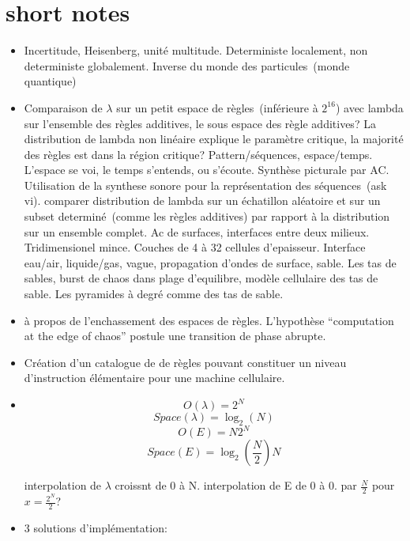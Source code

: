 \section{short notes}

\begin{itemize}

\item Incertitude, Heisenberg, unit\'e multitude. %
  Deterministe localement, non deterministe globalement. %
  Inverse du monde des particules~(monde quantique)

\item%
  Comparaison de $\lambda$ sur un petit espace de r\`egles~(inf\'erieure \`a
  $2^{16}$) avec lambda sur l'ensemble des r\`egles additives, le sous
  espace des r\`egle additives? %
  La distribution de lambda non lin\'eaire explique le param\`etre critique,
  la majorit\'e des r\`egles est dans la r\'egion critique?
  Pattern/s\'equences, espace/temps. %
  L'espace se voi, le temps s'entends, ou s'\'ecoute. %
  Synth\`ese picturale par AC. %
  Utilisation de la synthese sonore pour la repr\'esentation des s\'equences~(ask vi). %
  comparer distribution de lambda sur un \'echatillon al\'eatoire et sur un
  subset determin\'e~(comme les r\`egles additives)
  par rapport \`a la distribution sur un ensemble complet. %
  Ac de surfaces, interfaces entre deux milieux. %
  Tridimensionel mince. %
  Couches de 4 \`a 32 cellules d'epaisseur. %
  Interface eau/air, liquide/gas, vague, propagation d'ondes de surface, sable. %
  Les tas de sables, burst de chaos dans plage d'equilibre,
  mod\`ele cellulaire des tas de sable. %
  Les pyramides \`a degr\'e comme des tas de sable. %
  
\item \`a propos de l'enchassement des espaces de r\`egles. %
  L'hypoth\`ese ``computation at the edge of chaos'' postule une
  transition de phase abrupte.

\item Cr\'eation d'un catalogue de de r\`egles pouvant constituer un
  niveau d'instruction \'el\'ementaire pour une machine cellulaire.

\item%
  $$O(\lambda) = 2^N$$
  $$Space(\lambda) = \log_2(N)$$
  $$O(E) = N 2^N$$
  $$Space(E) = \log_2(\frac{N}{2}) N$$
  
  interpolation de $\lambda$ croissnt de 0 \`a N.
  interpolation de E de 0 \`a 0.
  par $\frac{N}{2}$ pour $x = \frac{2^N}{2}$?

\item%
  3 solutions d'impl\'ementation:


\end{itemize}
